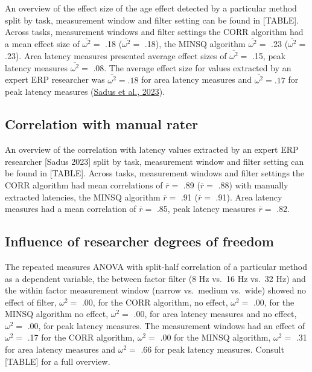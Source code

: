 \documentclass[
  man,floatsintext]{apa7}
\begin{document}
An overview of the effect size of the age effect detected by a particular method split by task, measurement window and filter setting can be found in {[}TABLE{]}. Across tasks, measurement windows and filter settings the CORR algorithm had a mean effect size of \(\overline{\omega^2} =\) .18 (\(\overline{\omega^2} =\) .18), the MINSQ algorithm \(\overline{\omega^2} =\) .23 (\(\overline{\omega^2} =\) .23). Area latency measures presented average effect sizes of \(\overline{\omega^2} =\) .15, peak latency measures \(\overline{\omega^2} =\) .08. The average effect size for values extracted by an expert ERP researcher was \(\overline{\omega^2} = .18\) for area latency measures and \(\overline{\omega^2} = .17\) for peak latency measures (\protect\hyperlink{ref-sadus2023multiverse}{Sadus et al., 2023}).

\hypertarget{correlation-with-manual-rater}{%
\subsection{Correlation with manual rater}\label{correlation-with-manual-rater}}

An overview of the correlation with latency values extracted by an expert ERP researcher {[}Sadus 2023{]} split by task, measurement window and filter setting can be found in {[}TABLE{]}. Across tasks, measurement windows and filter settings the CORR algorithm had mean correlations of \(\overline{r} =\) .89 (\(\overline{r} =\) .88) with manually extracted latencies, the MINSQ algorithm \(\overline{r} =\) .91 (\(\overline{r} =\) .91). Area latency measures had a mean correlation of \(\overline{r} =\) .85, peak latency measures \(\overline{r} =\) .82.

\hypertarget{influence-of-researcher-degrees-of-freedom}{%
\subsection{Influence of researcher degrees of freedom}\label{influence-of-researcher-degrees-of-freedom}}

The repeated measures ANOVA with split-half correlation of a particular method as a dependent variable, the between factor filter (8 Hz vs.~16 Hz vs.~32 Hz) and the within factor measurement window (narrow vs.~medium vs.~wide) showed no effect of filter, \(\omega^2 =\) .00, for the CORR algorithm, no effect, \(\omega^2 =\) .00, for the MINSQ algorithm no effect, \(\omega^2 =\) .00, for area latency measures and no effect, \(\omega^2 =\) .00, for peak latency measures. The measurement windows had an effect of \(\omega^2 =\) .17 for the CORR algorithm, \(\omega^2 =\) .00 for the MINSQ algorithm, \(\omega^2 =\) .31 for area latency measures and \(\omega^2 =\) .66 for peak latency measures. Consult {[}TABLE{]} for a full overview.
\end{document}

